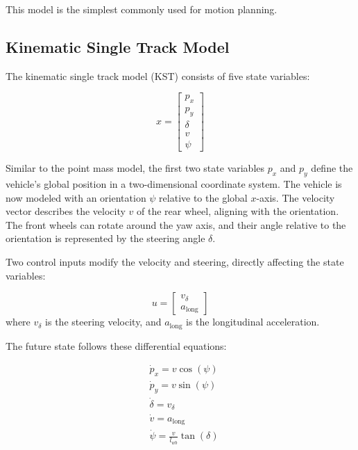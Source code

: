 This model is the simplest commonly used for motion planning.

\subsection{Kinematic Single Track Model}

The kinematic single track model (KST) consists of five state variables:

\begin{equation}
	x = \begin{bmatrix} p_x \\ p_y \\ \delta \\ v \\ \psi \end{bmatrix}
	\label{eq:states_kst}
\end{equation}

Similar to the point mass model, the first two state variables $p_x$ and $p_y$ define the vehicle's global position in a two-dimensional coordinate
system.
The vehicle is now modeled with an orientation $\psi$ relative to the global $x$-axis.
The velocity vector describes the velocity $v$ of the rear wheel, aligning with the orientation.
The front wheels can rotate around the yaw axis, and their angle relative to the orientation is represented by the steering angle $\delta$.

Two control inputs modify the velocity and steering, directly affecting the state variables:

\begin{equation}
	u = \begin{bmatrix} v_{\delta} \\ a_{\text{long}} \end{bmatrix}
	\label{eq:controls_kst}
\end{equation}
where $v_{\delta}$ is the steering velocity, and $a_{\text{long}}$ is the longitudinal acceleration.

The future state follows these differential equations:

\begin{align}
	 & \dot{p}_x = v\cos(\psi)                    \\
	 & \dot{p}_y = v\sin(\psi)                    \\
	 & \dot{\delta} = v_{\delta}                  \\
	 & \dot{v} = a_{\text{long}}                  \\
	 & \dot{\psi} = \frac{v}{l_{wb}} \tan(\delta) \\
\end{align}

